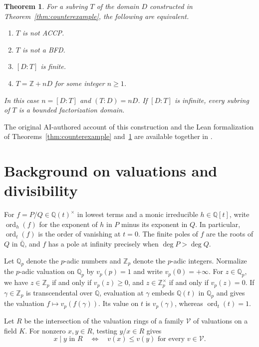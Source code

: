 \documentclass{article}
\DeclareMathOperator{\ord}{ord}
\newtheorem{theorem}[proposition]{Theorem}
\theoremstyle{remark}
\begin{document}
\begin{theorem}
    \label{thm:subring-classification}
    For a subring $T$ of the domain $D$ constructed in Theorem~\ref{thm:counterexample}, the following are equivalent.
    \begin{enumerate}
        \item $T$ is not ACCP.
        \item $T$ is not a BFD.
        \item $[D : T]$ is finite.
        \item $T = \mathbb{Z} + nD$ for some integer $n \ge 1$.
    \end{enumerate}
    In this case $n = [D : T]$ and $(T : D) = nD$.
    If $[D : T]$ is infinite, every subring of $T$ is a bounded factorization domain.
\end{theorem}

The original AI-authored account of this construction and the Lean formalization of Theorems~\ref{thm:counterexample} and~\ref{thm:subring-classification} are available together in \cite{LeanHA}.

\section{Background on valuations and divisibility}
\label{sec:background}

For $f = P/Q \in \mathbb{Q}(t)^\times$ in lowest terms and a monic irreducible $h \in \mathbb{Q}[t]$, write $\ord_h(f)$ for the exponent of $h$ in $P$ minus its exponent in $Q$.
In particular, $\ord_t(f)$ is the order of vanishing at $t = 0$.
The finite poles of $f$ are the roots of $Q$ in $\overline{\mathbb{Q}}$, and $f$ has a pole at infinity precisely when $\deg P > \deg Q$.

Let $\mathbb{Q}_p$ denote the $p$-adic numbers and $\mathbb{Z}_p$ denote the $p$-adic integers.
Normalize the $p$-adic valuation on $\mathbb{Q}_p$ by $v_p(p) = 1$ and write $v_p(0) = +\infty$.
For $z \in \mathbb{Q}_p$, we have $z \in \mathbb{Z}_p$ if and only if $v_p(z) \ge 0$, and $z \in \mathbb{Z}_p^\times$ if and only if $v_p(z) = 0$.
If $\gamma \in \mathbb{Z}_p$ is transcendental over $\mathbb{Q}$, evaluation at $\gamma$ embeds $\mathbb{Q}(t)$ in $\mathbb{Q}_p$ and gives the valuation $f \mapsto v_p(f(\gamma))$.
Its value on $t$ is $v_p(\gamma)$, whereas $\ord_t(t) = 1$.

Let $R$ be the intersection of the valuation rings of a family $\mathcal{V}$ of valuations on a field $K$.
For nonzero $x, y \in R$, testing $y/x \in R$ gives
\[
    x \mid y \text{ in } R
    \quad\Longleftrightarrow\quad
    v(x) \le v(y) \text{ for every } v \in \mathcal{V}.
\]
\end{document}
